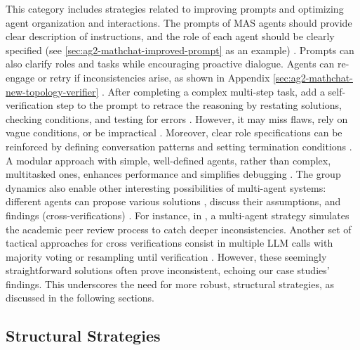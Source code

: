 This category includes strategies related to improving prompts and optimizing agent organization and interactions. 
The prompts of MAS agents should provide clear description of instructions, and the role of each agent should be clearly specified (see \ref{sec:ag2-mathchat-improved-prompt} as an example) \cite{he2024does,talebirad2023multi}. 
Prompts can also clarify roles and tasks while encouraging proactive dialogue. Agents can re-engage or retry if inconsistencies arise, as shown in Appendix \ref{sec:ag2-mathchat-new-topology-verifier} \cite{chan2023chateval}.
After completing a complex multi-step task, add a self-verification step to the prompt to retrace the reasoning by restating solutions, checking conditions, and testing for errors \cite{weng2023large}. 
However, it may miss flaws, rely on vague conditions, or be impractical \cite{stoica2024specifications}. 
Moreover, clear role specifications can be reinforced by defining conversation patterns and setting termination conditions \cite{wu2024autogen, langgraph}. 
A modular approach with simple, well-defined agents, rather than complex, multitasked ones, enhances performance and simplifies debugging \cite{anthropic2024}.
The group dynamics also enable other interesting possibilities of multi-agent systems: different agents can propose various solutions \cite{yao2024tree}, discuss their assumptions, and findings (cross-verifications) \cite{haji2024improving}. 
For instance, in \cite{xu2023towards}, a multi-agent strategy simulates the academic peer review process to catch deeper inconsistencies.
Another set of tactical approaches for cross verifications consist in multiple LLM calls with majority voting or resampling until verification \cite{stroebl2024inference, chen2024more}. 
However, these seemingly straightforward solutions often prove inconsistent, echoing our case studies' findings. This underscores the need for more robust, structural strategies, as discussed in the following sections.



\subsection{Structural Strategies}
\label{sec:comprehensive_systemic_strategies}

